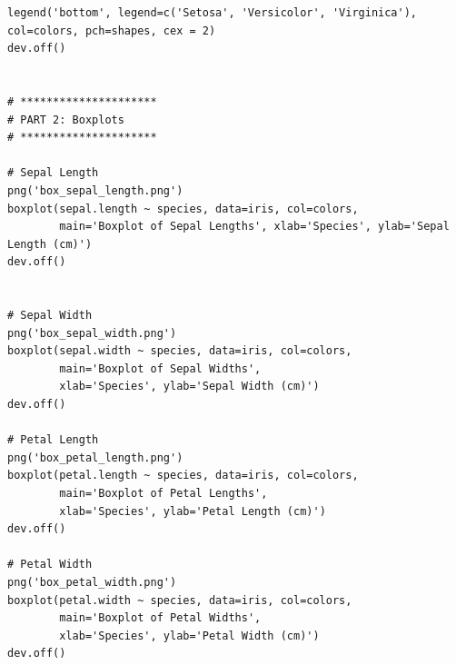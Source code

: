 \documentclass{article}
\begin{document}
\begin{lstlisting}[style=R]
legend('bottom', legend=c('Setosa', 'Versicolor', 'Virginica'), col=colors, pch=shapes, cex = 2)
dev.off()


# *********************
# PART 2: Boxplots
# *********************

# Sepal Length
png('box_sepal_length.png')
boxplot(sepal.length ~ species, data=iris, col=colors,
        main='Boxplot of Sepal Lengths', xlab='Species', ylab='Sepal Length (cm)')
dev.off()


# Sepal Width
png('box_sepal_width.png')
boxplot(sepal.width ~ species, data=iris, col=colors,
        main='Boxplot of Sepal Widths',
        xlab='Species', ylab='Sepal Width (cm)')
dev.off()

# Petal Length
png('box_petal_length.png')
boxplot(petal.length ~ species, data=iris, col=colors,
        main='Boxplot of Petal Lengths',
        xlab='Species', ylab='Petal Length (cm)')
dev.off()

# Petal Width
png('box_petal_width.png')
boxplot(petal.width ~ species, data=iris, col=colors,
        main='Boxplot of Petal Widths',
        xlab='Species', ylab='Petal Width (cm)')
dev.off()
\end{lstlisting}
\end{document}
